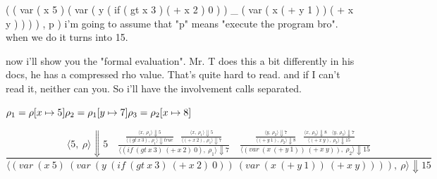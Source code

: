 \documentclass[11pt]{article}
\begin{document}
\begin{enumerate}
\begin{markdown}
            ( ( var ( x 5 ) ( var ( y ( if ( gt x 3 ) ( + x 2 ) 0 ) )
            _
            ( var ( x ( + y 1 ) ) ( + x y ) ) ) ) , p )
            i'm going to assume that "p" means "execute the program bro".
            when we do it turns into 15.

            now i'll show you the "formal evaluation".
            Mr. T does this a bit differently in his docs, he has a compressed rho value.
            That's quite hard to read. and if I can't read it, neither can you.
            So i'll have the involvement calls separated.
        \end{markdown}

        \begin{math}
            \rho_1 = \rho[x \mapsto 5] \\
            \rho_2 = \rho_1[y \mapsto 7] \\
            \rho_3 = \rho_2[x \mapsto 8]
        \end{math}

        \[
            \frac{
                \langle 5,\ \rho \rangle \Downarrow 5
                \quad
                \frac{
                    \frac{
                        \langle x,\ \rho_1 \rangle \Downarrow 5
                    }{
                        \langle (gt\ x\ 3),\ \rho_1 \rangle \Downarrow true
                    }
                    \quad
                    \frac{
                        \langle x,\ \rho_1 \rangle \Downarrow 5
                    }{
                        \langle (+\ x\ 2),\ \rho_1 \rangle \Downarrow 7
                    }
                }{
                    \langle (if\ (gt\ x\ 3)\ (+\ x\ 2)\ 0),\ \rho_1 \rangle \Downarrow 7
                }
                \quad
                \frac{
                    \frac{
                        \langle y,\ \rho_2 \rangle \Downarrow 7
                    }{
                        \langle (+\ y\ 1),\ \rho_2 \rangle \Downarrow 8
                    }
                    \quad
                    \frac{
                        \langle x,\ \rho_3 \rangle \Downarrow 8
                        \quad
                        \langle y,\ \rho_3 \rangle \Downarrow 7
                    }{
                        \langle (+\ x\ y),\ \rho_3 \rangle \Downarrow 15
                    }
                }{
                    \langle (var\ (x\ (+\ y\ 1))\ (+\ x\ y)),\ \rho_2 \rangle \Downarrow 15
                }
            }{
                \langle (var\ (x\ 5)\ (var\ (y\ (if\ (gt\ x\ 3)\ (+\ x\ 2)\ 0))\ (var\ (x\ (+\ y\ 1))\ (+\ x\ y)))),\ \rho \rangle \Downarrow 15
            }
        \]


\end{enumerate}
\end{document}
